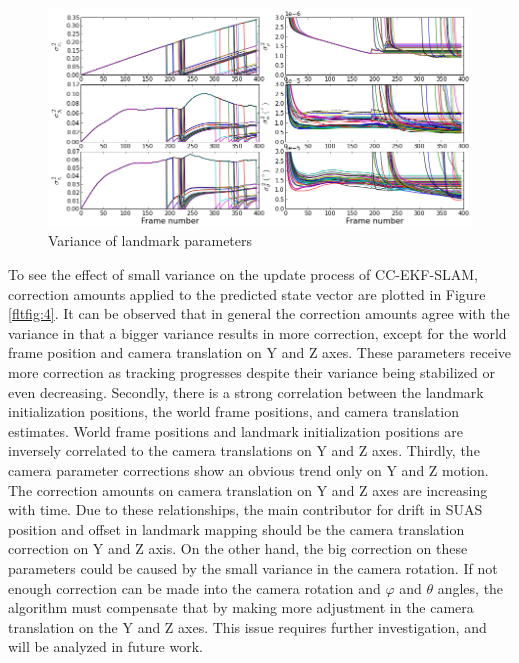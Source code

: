 \begin{figure}[h]
\centering
\includegraphics[width=14cm, keepaspectratio=true]
{./Figures/fltfig/cut1/Figure40.png}
\caption{Variance of landmark parameters}
\label{fltfig:3}
\end{figure}
\FloatBarrier

To see the effect of small variance on the update process of
CC-EKF-SLAM, correction amounts applied to the predicted state vector
are plotted in Figure \ref{fltfig:4}. It can be observed that in
general the correction amounts agree with the variance in that a
bigger variance results in more correction, except for the world frame
position and camera translation on Y and Z axes. These parameters
receive more correction as tracking progresses despite their variance
being stabilized or even decreasing. Secondly, there is a strong
correlation between the landmark initialization positions, the world
frame positions, and camera translation estimates. World frame
positions and landmark initialization positions are inversely
correlated to the camera translations on Y and Z axes. Thirdly, the
camera parameter corrections show an obvious trend only on Y and Z
motion. The correction amounts on camera translation on Y and Z axes
are increasing with time. Due to these relationships, the main
contributor for drift in SUAS position and offset in landmark mapping
should be the camera translation correction on Y and Z axis. On the
other hand, the big correction on these parameters could be caused by
the small variance in the camera rotation. If not enough correction
can be made into the camera rotation and $\varphi$ and $\theta$
angles, the algorithm must compensate that by making more adjustment
in the camera translation on the Y and Z axes. This issue requires
further investigation, and will be analyzed in future work.

